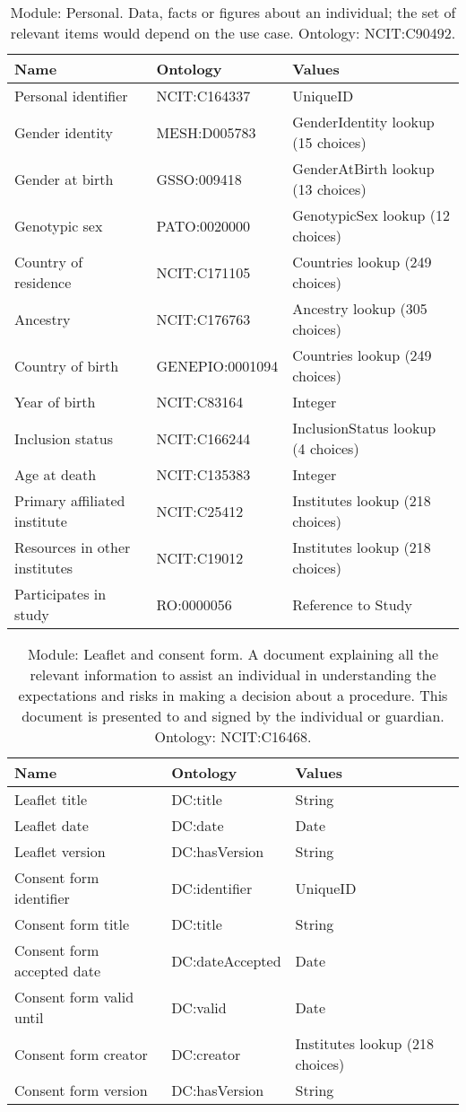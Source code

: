 \documentclass{article}
\begin{document}
\begin{table}[htb]
\begin{tabular}{lll}
Name & Ontology & Values \\
\hline
Personal identifier & NCIT:C164337 & UniqueID \\
Gender identity & MESH:D005783 & GenderIdentity lookup (15 choices) \\
Gender at birth & GSSO:009418 & GenderAtBirth lookup (13 choices) \\
Genotypic sex & PATO:0020000 & GenotypicSex lookup (12 choices) \\
Country of residence & NCIT:C171105 & Countries lookup (249 choices) \\
Ancestry & NCIT:C176763 & Ancestry lookup (305 choices) \\
Country of birth & GENEPIO:0001094 & Countries lookup (249 choices) \\
Year of birth & NCIT:C83164 & Integer \\
Inclusion status & NCIT:C166244 & InclusionStatus lookup (4 choices) \\
Age at death & NCIT:C135383 & Integer \\
Primary affiliated institute & NCIT:C25412 & Institutes lookup (218 choices) \\
Resources in other institutes & NCIT:C19012 & Institutes lookup (218 choices) \\
Participates in study & RO:0000056 & Reference to Study \\
\hline
\end{tabular}
\caption[Module: Personal]{\label{table:table3} Module: Personal. Data, facts or figures about an individual; the set of relevant items would depend on the use case. Ontology: NCIT:C90492. }
\end{table}

\begin{table}[htb]
\begin{tabular}{lll}
Name & Ontology & Values \\
\hline
Leaflet title & DC:title & String \\
Leaflet date & DC:date & Date \\
Leaflet version & DC:hasVersion & String \\
Consent form identifier & DC:identifier & UniqueID \\
Consent form title & DC:title & String \\
Consent form accepted date & DC:dateAccepted & Date \\
Consent form valid until & DC:valid & Date \\
Consent form creator & DC:creator & Institutes lookup (218 choices) \\
Consent form version & DC:hasVersion & String \\
\hline
\end{tabular}
\caption[Module: Leaflet and consent form]{\label{table:table4} Module: Leaflet and consent form. A document explaining all the relevant information to assist an individual in understanding the expectations and risks in making a decision about a procedure. This document is presented to and signed by the individual or guardian. Ontology: NCIT:C16468. }
\end{table}
\end{document}
